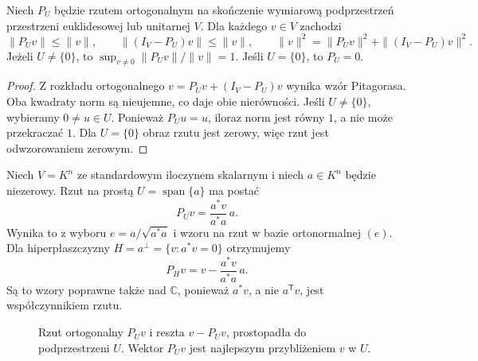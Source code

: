 \begin{stwierdzenie}
\label{prop:lin13-kontrakcja}
Niech \(P_U\) będzie rzutem
ortogonalnym na skończenie
wymiarową podprzestrzeń
przestrzeni euklidesowej
lub unitarnej \(V\).
Dla każdego \(v\in V\) zachodzi
\[
 \|P_Uv\|\le\|v\|,\qquad
 \|(I_V-P_U)v\|\le\|v\|,
 \qquad
 \|v\|^2=\|P_Uv\|^2+
             \|(I_V-P_U)v\|^2.
\]
Jeżeli \(U\ne\{0\}\), to
\(\sup_{v\ne0}\|P_Uv\|/\|v\|=1\).
Jeśli \(U=\{0\}\), to \(P_U=0\).
\end{stwierdzenie}
\begin{proof}
Z rozkładu ortogonalnego
\(v=P_Uv+(I_V-P_U)v\)
wynika wzór Pitagorasa.
Oba kwadraty norm są
nieujemne, co daje obie
nierówności. Jeśli
\(U\ne\{0\}\), wybieramy
\(0\ne u\in U\). Ponieważ
\(P_Uu=u\), iloraz norm
jest równy \(1\), a
nie może przekraczać \(1\).
Dla \(U=\{0\}\) obraz rzutu
jest zerowy, więc rzut
jest odwzorowaniem zerowym.
\end{proof}

\begin{przyklad}
\label{prz:lin13-prosta}
Niech \(V=K^n\) ze standardowym
iloczynem skalarnym i niech \(a\in K^n\)
będzie niezerowy. Rzut na prostą
\(U=\operatorname{span}\{a\}\) ma postać
\[
 P_Uv=\frac{a^*v}{a^*a}\,a.
\]
Wynika to z wyboru
\(e=a/\sqrt{a^*a}\)
i wzoru na rzut w bazie
ortonormalnej \((e)\).
Dla hiperpłaszczyzny
\(H=a^\perp=\{v:a^*v=0\}\)
otrzymujemy
\[
 P_Hv=v-\frac{a^*v}{a^*a}\,a.
\]
Są to wzory poprawne także
nad \(\mathbb C\), ponieważ
\(a^*v\), a nie \(a^{\mathsf T}v\),
jest współczynnikiem rzutu.
\end{przyklad}

\begin{figure}[!htbp]
\centering
{}
\caption{Rzut ortogonalny \(P_Uv\) i reszta
\(v-P_Uv\), prostopadła do podprzestrzeni \(U\).
Wektor \(P_Uv\) jest najlepszym
przybliżeniem \(v\) w \(U\).}
\label{fig:lin13-rzut-geometryczny}
\end{figure}


